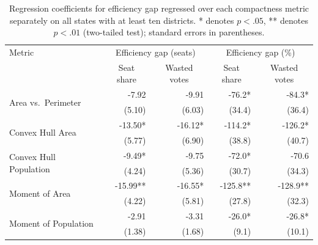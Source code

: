 \documentclass[12pt]{article}
\begin{document}
  \begin{table}
    \begin{center}
      \begin{tabular}{lrrrr}\toprule
        Metric & \multicolumn{2}{c}{Efficiency gap (seats)} & \multicolumn{2}{c}{Efficiency gap (\%)} \\
               & \multicolumn{1}{c}{Seat share} & \multicolumn{1}{c}{Wasted votes} & \multicolumn{1}{c}{Seat share} & \multicolumn{1}{c}{Wasted votes} \\\midrule
        \multirow{2}{*}{Area vs.~Perimeter} & -7.92 & -9.91 & -76.2* & -84.3* \\
        & (5.10) & (6.03) & (34.4) & (36.4) \\\midrule
        \multirow{2}{*}{Convex Hull Area} & -13.50* & -16.12* & -114.2* & -126.2* \\
        & (5.77) & (6.90) & (38.8) & (40.7) \\\midrule
        \multirow{2}{*}{Convex Hull Population} & -9.49* & -9.75 & -72.0* & -70.6 \\
        & (4.24) & (5.36) & (30.7) & (34.3) \\\midrule
        \multirow{2}{*}{Moment of Area} & -15.99** & -16.55* & -125.8** & -128.9** \\
        & (4.22) & (5.81) & (27.8) & (32.3) \\\midrule
        \multirow{2}{*}{Moment of Population} & -2.91 & -3.31 & -26.0* & -26.8* \\
        & (1.38) & (1.68) & (9.1) & (10.1) \\\bottomrule
      \end{tabular}
      \caption{Regression coefficients for efficiency gap regressed over each compactness metric separately on all states with at least ten districts.  * denotes $p<.05$, ** denotes $p<.01$ (two-tailed test); standard errors in parentheses.\label{t:efficiency10}}
    \end{center}
  \end{table}
\end{document}
